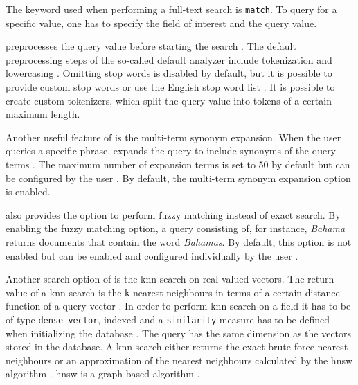 The keyword used when performing a full-text search is \texttt{match}.
To query for a specific value, one has to specify the field of interest and the query value.

\databaseName{} preprocesses the query value before starting the search \cite{Elasticsearch-text-analyser}.
The default preprocessing steps of the so-called default analyzer include tokenization and lowercasing \cite{Elasticsearch-text-analyser}. 
Omitting stop words is disabled by default, but it is possible to provide custom stop words or use the English stop word list \cite{Elasticsearch-text-analyser}.
It is possible to create custom tokenizers, which split the query value into tokens of a certain maximum length.

Another useful feature of \databaseName{} is the multi-term synonym expansion.
When the user queries a specific phrase, \databaseName{} expands the query to include synonyms of the query terms \cite{Elasticsearch-synonyms}.
The maximum number of expansion terms is set to 50 by default but can be configured by the user \cite{Elasticsearch-match}.
By default, the multi-term synonym expansion option is enabled.

\databaseName{} also provides the option to perform fuzzy matching instead of exact search.
By enabling the fuzzy matching option, a \databaseName{} query consisting of, for instance, \textit{Bahama} returns documents that contain the word \textit{Bahamas}.
By default, this option is not enabled but can be enabled and configured individually by the user \cite{Elasticsearch-match}.


Another search option of \databaseName{} is the \ac{knn} search on real-valued vectors.
The return value of a \ac{knn} search is the \texttt{k} nearest neighbours in terms of a certain distance function of a query vector \cite{Elasticsearch-kNN-HNSW}.
In order to perform \ac{knn} search on a field it has to be of type \texttt{dense\_vector}, 
indexed and a \texttt{similarity} measure has to be defined when initializing the database \cite{Elasticsearch-knn}.
The query has the same dimension as the vectors stored in the database.
A \ac{knn} search either returns the exact brute-force nearest neighbours or 
an approximation of the nearest neighbours calculated by the \ac{hnsw} algorithm \cite{Elasticsearch-kNN-HNSW, Elasticsearch-knn}.
\ac{hnsw} is a graph-based algorithm \cite{Elasticsearch-kNN-HNSW}.

